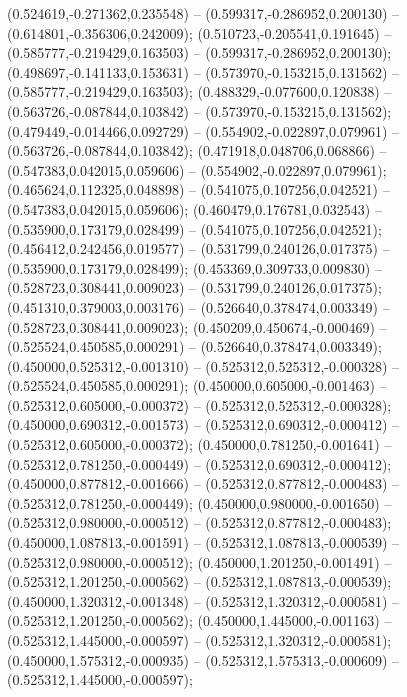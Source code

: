  (0.524619,-0.271362,0.235548) -- (0.599317,-0.286952,0.200130) -- (0.614801,-0.356306,0.242009);
 (0.510723,-0.205541,0.191645) -- (0.585777,-0.219429,0.163503) -- (0.599317,-0.286952,0.200130);
 (0.498697,-0.141133,0.153631) -- (0.573970,-0.153215,0.131562) -- (0.585777,-0.219429,0.163503);
 (0.488329,-0.077600,0.120838) -- (0.563726,-0.087844,0.103842) -- (0.573970,-0.153215,0.131562);
 (0.479449,-0.014466,0.092729) -- (0.554902,-0.022897,0.079961) -- (0.563726,-0.087844,0.103842);
 (0.471918,0.048706,0.068866) -- (0.547383,0.042015,0.059606) -- (0.554902,-0.022897,0.079961);
 (0.465624,0.112325,0.048898) -- (0.541075,0.107256,0.042521) -- (0.547383,0.042015,0.059606);
 (0.460479,0.176781,0.032543) -- (0.535900,0.173179,0.028499) -- (0.541075,0.107256,0.042521);
 (0.456412,0.242456,0.019577) -- (0.531799,0.240126,0.017375) -- (0.535900,0.173179,0.028499);
 (0.453369,0.309733,0.009830) -- (0.528723,0.308441,0.009023) -- (0.531799,0.240126,0.017375);
 (0.451310,0.379003,0.003176) -- (0.526640,0.378474,0.003349) -- (0.528723,0.308441,0.009023);
 (0.450209,0.450674,-0.000469) -- (0.525524,0.450585,0.000291) -- (0.526640,0.378474,0.003349);
 (0.450000,0.525312,-0.001310) -- (0.525312,0.525312,-0.000328) -- (0.525524,0.450585,0.000291);
 (0.450000,0.605000,-0.001463) -- (0.525312,0.605000,-0.000372) -- (0.525312,0.525312,-0.000328);
 (0.450000,0.690312,-0.001573) -- (0.525312,0.690312,-0.000412) -- (0.525312,0.605000,-0.000372);
 (0.450000,0.781250,-0.001641) -- (0.525312,0.781250,-0.000449) -- (0.525312,0.690312,-0.000412);
 (0.450000,0.877812,-0.001666) -- (0.525312,0.877812,-0.000483) -- (0.525312,0.781250,-0.000449);
 (0.450000,0.980000,-0.001650) -- (0.525312,0.980000,-0.000512) -- (0.525312,0.877812,-0.000483);
 (0.450000,1.087813,-0.001591) -- (0.525312,1.087813,-0.000539) -- (0.525312,0.980000,-0.000512);
 (0.450000,1.201250,-0.001491) -- (0.525312,1.201250,-0.000562) -- (0.525312,1.087813,-0.000539);
 (0.450000,1.320312,-0.001348) -- (0.525312,1.320312,-0.000581) -- (0.525312,1.201250,-0.000562);
 (0.450000,1.445000,-0.001163) -- (0.525312,1.445000,-0.000597) -- (0.525312,1.320312,-0.000581);
 (0.450000,1.575312,-0.000935) -- (0.525312,1.575313,-0.000609) -- (0.525312,1.445000,-0.000597);
